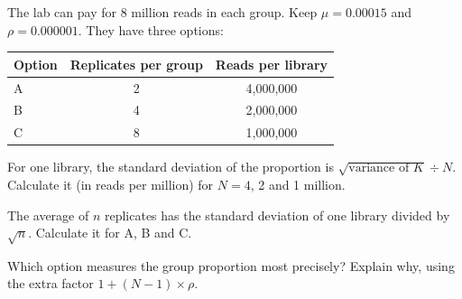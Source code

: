 \begin{exlist}[resume*=ex1]
\item \tagdecide{} The lab can pay for 8 million reads in each group. Keep
$\mu = 0.00015$ and $\rho = 0.000001$. They have three options:
\begin{center}
\begin{tabular}{lcc}
\toprule
Option & Replicates per group & Reads per library\\
\midrule
A & 2 & 4{,}000{,}000\\
B & 4 & 2{,}000{,}000\\
C & 8 & 1{,}000{,}000\\
\bottomrule
\end{tabular}
\end{center}
\begin{parts}
\item For one library, the standard deviation of the proportion is
  $\sqrt{\text{variance of } K} \div N$. Calculate it (in reads per million)
  for $N = 4$, 2 and 1 million.
\item The average of $n$ replicates has the standard deviation of one
  library divided by $\sqrt{n}$. Calculate it for A, B and C.
\item Which option measures the group proportion most precisely? Explain
  why, using the extra factor $1 + (N-1) \times \rho$.
\end{parts}
\end{exlist}

